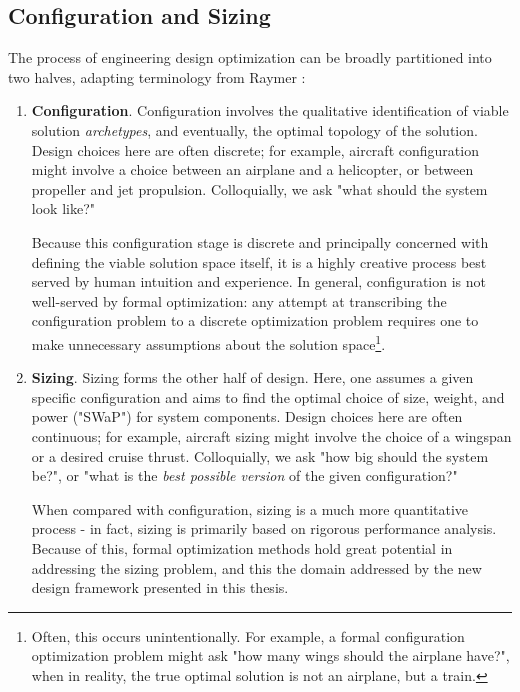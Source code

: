 \subsection{Configuration and Sizing}

The process of engineering design optimization can be broadly partitioned into two halves, adapting terminology from Raymer \cite{raymer}:

\begin{example}
    \begin{enumerate}
        \item \textbf{Configuration}. Configuration involves the qualitative identification of viable solution \textit{archetypes}, and eventually, the optimal topology of the solution. Design choices here are often discrete; for example, aircraft configuration might involve a choice between an airplane and a helicopter, or between propeller and jet propulsion. Colloquially, we ask "what should the system look like?"

        Because this configuration stage is discrete and principally concerned with defining the viable solution space itself, it is a highly creative process best served by human intuition and experience. In general, configuration is not well-served by formal optimization: any attempt at transcribing the configuration problem to a discrete optimization problem requires one to make unnecessary assumptions about the solution space\footnote{Often, this occurs unintentionally. For example, a formal configuration optimization problem might ask "how many wings should the airplane have?", when in reality, the true optimal solution is not an airplane, but a train.}.

        \item \textbf{Sizing}. Sizing forms the other half of design. Here, one assumes a given specific configuration and aims to find the optimal choice of size, weight, and power ("SWaP") for system components. Design choices here are often continuous; for example, aircraft sizing might involve the choice of a wingspan or a desired cruise thrust. Colloquially, we ask "how big should the system be?", or "what is the \textit{best possible version} of the given configuration?"

        When compared with configuration, sizing is a much more quantitative process - in fact, sizing is primarily based on rigorous performance analysis. Because of this, formal optimization methods hold great potential in addressing the sizing problem, and this the domain addressed by the new design framework presented in this thesis.

    \end{enumerate}
\end{example}

